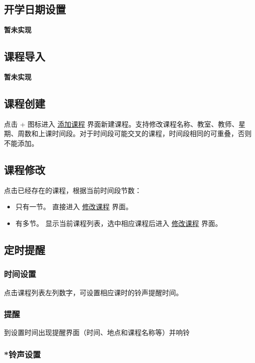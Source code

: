 \documentclass{article}
\begin{document}
  \subsection{开学日期设置}

    \bf 暂未实现

  \subsection{课程导入}

    \bf 暂未实现

  \subsection{课程创建}

    点击 + 图标进入 \uline{添加课程} 界面新建课程。支持修改课程名称、教室、教师、星
    期、周数和上课时间段。对于时间段可能交叉的课程，时间段相同的可重叠，否则不能添加。

  \subsection{课程修改}

    点击已经存在的课程，根据当前时间段节数：
    \begin{itemize}
      \item 只有一节。 直接进入 \uline{修改课程} 界面。
      \item 有多节。 显示当前课程列表，选中相应课程后进入 \uline{修改课程} 界面。
    \end{itemize}

  \subsection{定时提醒}

    \subsubsection{时间设置}

      点击课程列表左列数字，可设置相应课时的铃声提醒时间。

    \subsubsection{提醒}

      到设置时间出现提醒界面（时间、地点和课程名称等）并响铃

    \subsubsection{*铃声设置}
\end{document}
